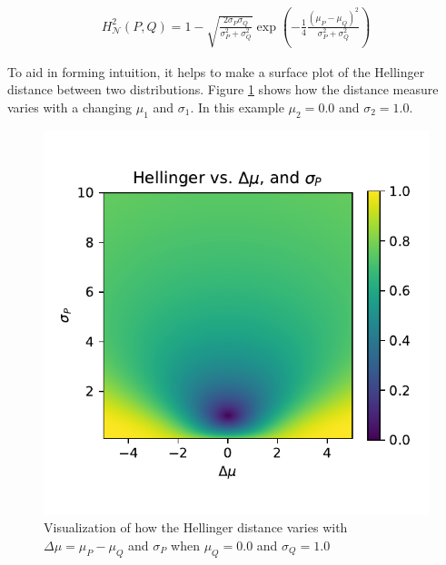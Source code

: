 %

\begin{align}
    H_{\mathcal{N}}^{2}(P,Q) = 1-\sqrt{\frac{2\sigma_P\sigma_Q}{\sigma_P^2+\sigma_Q^2}}\exp{\left(-\frac{1}{4}\frac{(\mu_P-\mu_Q)^2}{\sigma_P^2+\sigma_Q^2}\right)}
\end{align}

To aid in forming intuition, it helps to make a surface plot of the Hellinger distance between two distributions. Figure \ref{fig:hellinger_surf} shows how the distance measure varies with a changing $\mu_1$ and $\sigma_1$. In this example $\mu_2=0.0$ and $\sigma_2=1.0$.

\begin{figure}[tbp]
    \centering
    \includegraphics[width=0.9\linewidth]{Figures/hellinger_surf}
    \caption{Visualization of how the Hellinger distance varies with $\Delta\mu=\mu_P-\mu_Q$ and $\sigma_P$ when $\mu_Q=0.0$ and $\sigma_Q=1.0$}
    \label{fig:hellinger_surf}
\end{figure}

